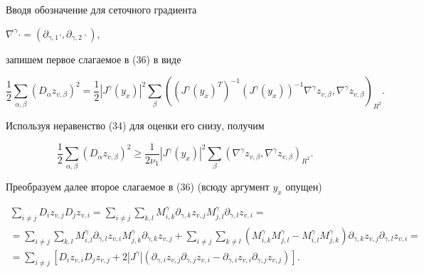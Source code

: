  


Вводя обозначение для сеточного градиента  


$\nabla^\gamma\cdot=(\partial_{\gamma,1}\cdot,\partial_{\gamma,2}\cdot),$ 


запишем первое слагаемое в (36) в виде 


$$ 


\frac12\sum_{\alpha,\beta}(D_\alpha z_{v,\beta})^2=\frac12 


|J^\gamma(y_x)|^2\sum_\beta((J^\gamma(y_x)^T)^{-1} 


(J^\gamma(y_x))^{-1}\nabla^\gamma z_{v,\beta},\nabla^\gamma z_{v,\beta} 


)_{R^2}. 


$$ 


Используя неравенство (34) для оценки его снизу, получим 


$$ 


\frac12\sum_{\alpha,\beta}(D_\alpha z_{v,\beta})^2 \ge 


\frac{1}{2\nu_1}|J^\gamma(y_x)|^2\sum_\beta 


(\nabla^\gamma z_{v,\beta},\nabla^\gamma z_{v,\beta})_{R^2}. 


$$ 


Преобразуем далее второе слагаемое в (36) (всюду аргумент $y_x$ опущен) 


\begin{gather*} 


\sum_{i\ne j}D_i z_{v,j}D_jz_{v,i}=\sum_{i\ne j}\sum_{k,l} 


 M^\gamma_{i,k}\partial_{\gamma,k}z_{v,j} 


 M^\gamma_{j,l}\partial_{\gamma,l}z_{v,i}= \\ 


%


=\sum_{i\ne j}\sum_{k,l}


 M^\gamma_{i,l}\partial_{\gamma,l}z_{v,i} 


 M^\gamma_{j,k}\partial_{\gamma,k}z_{v,j}+


\sum_{i\ne j}\sum_{k\ne l}


 (M^\gamma_{i,k}M^\gamma_{j,l}-M^\gamma_{i,l}M^\gamma_{j,k}) 


 \partial_{\gamma,k}z_{v,j}\partial_{\gamma,l}z_{v,i} =\\


%


=\sum_{i\ne j}[D_i z_{v,i}D_j z_{v,j}+2|J^\gamma| 


(\partial_{\gamma,i}z_{v,j}\partial_{\gamma,j}z_{v,i}- 


\partial_{\gamma,i}z_{v,i}\partial_{\gamma,j}z_{v,j})]. 


\end{gather*} 


